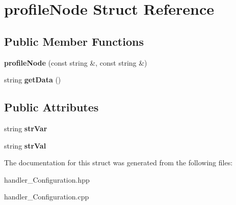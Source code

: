\hypertarget{structprofileNode}{
\section{profileNode Struct Reference}
\label{structprofileNode}
}
\subsection*{Public Member Functions}
\begin{DoxyCompactItemize}
\item 
\hypertarget{structprofileNode_a406a027ccda90573940b1fd7dc019652}{
{\bfseries profileNode} (const string \&, const string \&)}
\label{structprofileNode_a406a027ccda90573940b1fd7dc019652}

\item 
\hypertarget{structprofileNode_aa2d5252dd9a7e41c78a43ebdf6cc3301}{
string {\bfseries getData} ()}
\label{structprofileNode_aa2d5252dd9a7e41c78a43ebdf6cc3301}

\end{DoxyCompactItemize}
\subsection*{Public Attributes}
\begin{DoxyCompactItemize}
\item 
\hypertarget{structprofileNode_a6b91777554bee2d799c90ea4f650490c}{
string {\bfseries strVar}}
\label{structprofileNode_a6b91777554bee2d799c90ea4f650490c}

\item 
\hypertarget{structprofileNode_a138f86b8e22541f1bf6a12dd361ac1bb}{
string {\bfseries strVal}}
\label{structprofileNode_a138f86b8e22541f1bf6a12dd361ac1bb}

\end{DoxyCompactItemize}


The documentation for this struct was generated from the following files:\begin{DoxyCompactItemize}
\item 
handler\_\-Configuration.hpp\item 
handler\_\-Configuration.cpp\end{DoxyCompactItemize}
